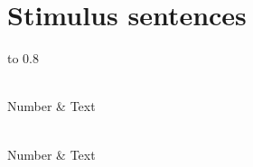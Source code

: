\chapter{Stimulus sentences\label{apx:HarvardSents}}
\begin{longtabu} to 0.8
	\caption[\ac{ieee} “Harvard” sentences used as stimuli]{\ac{ieee} “Harvard” sentences used as stimuli. Here “number” combines the “list” and “sentence” numbers from the original numeration given in \citet{HarvardSents}\label{tab:HarvardSents}}\\
	\toprule
	\rowfont[c]{\bfseries} Number & Text \\
	\midrule
	\endfirsthead

	\caption[]{\ac{ieee} “Harvard” sentences used as stimuli {\itshape (continued from previous page)}}\\
	\midrule
	\rowfont[c]{\bfseries} Number & Text \\
	\midrule
	\endhead
	
	\midrule 
	 \\
	\endfoot
	
	\bottomrule
	\endlastfoot


\end{longtabu}
